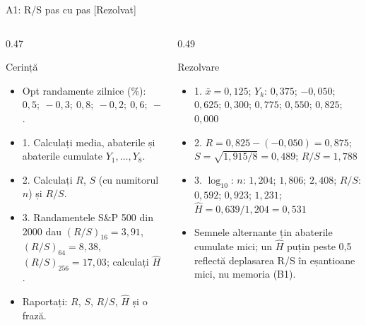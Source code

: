 \begin{frame}{A1: R/S pas cu pas [Rezolvat]}
\itemsize{\scriptsize}
\begin{columns}[T]
\begin{column}{0.47\textwidth}
\begin{block}{Cerință}
\begin{itemize}
    \item Opt randamente zilnice (\%): $0{,}5;\ -0{,}3;\ 0{,}8;\ -0{,}2;\ 0{,}6;\ -0{,}1;\ 0{,}4;\ -0{,}7$.
    \item 1. Calculați media, abaterile și abaterile cumulate $Y_1, \dots, Y_8$.
    \item 2. Calculați $R$, $S$ (cu numitorul $n$) și $R/S$.
    \item 3. Randamentele S\&P 500 din 2000 dau $(R/S)_{16} = 3{,}91$, $(R/S)_{64} = 8{,}38$, $(R/S)_{256} = 17{,}03$; calculați $\hat H$.
    \item Raportați: $R$, $S$, $R/S$, $\hat H$ și o frază.
\end{itemize}
\end{block}
\end{column}
\begin{column}{0.49\textwidth}
\begin{exampleblock}{Rezolvare}
\begin{itemize}
    \item 1. $\bar x = 0{,}125$; $Y_k$: $0{,}375$; $-0{,}050$; $0{,}625$; $0{,}300$; $0{,}775$; $0{,}550$; $0{,}825$; $0{,}000$
    \item 2. $R = 0{,}825 - (-0{,}050) = 0{,}875$; $S = \sqrt{1{,}915/8} = 0{,}489$; $R/S = 1{,}788$
    \item 3. $\log_{10}$: $n$: $1{,}204$; $1{,}806$; $2{,}408$; $R/S$: $0{,}592$; $0{,}923$; $1{,}231$; $\hat H = 0{,}639/1{,}204 = 0{,}531$
    \item Semnele alternante țin abaterile cumulate mici; un $\hat H$ puțin peste 0,5 reflectă deplasarea R/S în eșantioane mici, nu memoria (B1).
\end{itemize}
\end{exampleblock}
\end{column}
\end{columns}
\end{frame}

